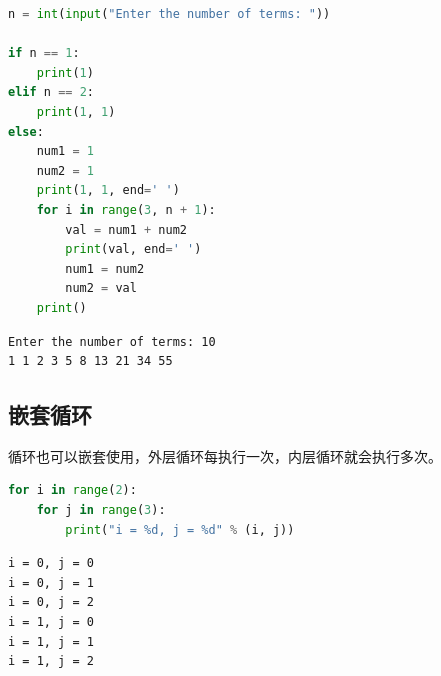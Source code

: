 \begin{lstlisting}[language=Python]
n = int(input("Enter the number of terms: "))

if n == 1:
	print(1)
elif n == 2:
	print(1, 1)
else:
	num1 = 1
	num2 = 1
	print(1, 1, end=' ')
	for i in range(3, n + 1):
		val = num1 + num2
		print(val, end=' ')
		num1 = num2
		num2 = val
	print()
\end{lstlisting}

\begin{tcolorbox}
	\begin{verbatim}
Enter the number of terms: 10
1 1 2 3 5 8 13 21 34 55
\end{verbatim}
\end{tcolorbox}

\vspace{0.5cm}

\subsection{嵌套循环}

循环也可以嵌套使用，外层循环每执行一次，内层循环就会执行多次。

\vspace{-0.5cm}

\begin{lstlisting}[language=Python]
for i in range(2):
	for j in range(3):
		print("i = %d, j = %d" % (i, j))
\end{lstlisting}

\begin{tcolorbox}
	\begin{verbatim}
i = 0, j = 0
i = 0, j = 1
i = 0, j = 2
i = 1, j = 0
i = 1, j = 1
i = 1, j = 2
\end{verbatim}
\end{tcolorbox}

\vspace{0.5cm}

\\

